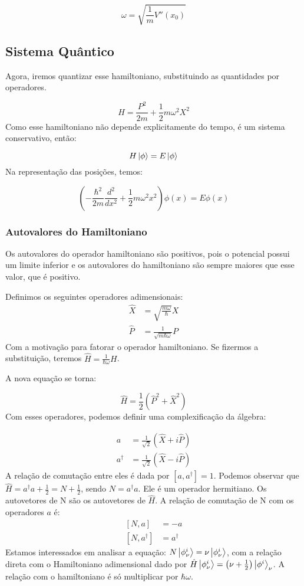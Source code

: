 \documentclass{article}
\begin{document}
	$$\omega =\sqrt{ \frac{1}{m}V''(x_{0}) }$$
	\subsection{Sistema Quântico}
	
	Agora, iremos quantizar esse hamiltoniano, substituindo as quantidades por operadores.
	
	$$
	H=\frac {P^{2}}{2m}
	+\frac{1}{2}m\omega^{2}X^{2}
	$$
	Como esse hamiltoniano não depende explicitamente do tempo, é um sistema conservativo, então:
	
	$$H\ket{\phi}=E\ket{\phi}  $$
	Na representação das posições, temos:
	
	$$(-\frac{\hbar^{2}}{2m} \frac{d^{2}}{dx^{2}}+\frac{1}{2}m\omega^{2}x^{2})\phi(x)=E\phi(x)$$
	\subsubsection{Autovalores do Hamiltoniano}
	Os autovalores do operador hamiltoniano são positivos, pois o potencial possui um limite inferior e os autovalores do hamiltoniano são sempre maiores que esse valor, que é positivo.
	
	Definimos os seguintes operadores adimensionais:
	$$
	\begin{aligned}
		\hat{X}&=\sqrt{ \frac{m\omega}{\hbar} }X \\
		\hat{P}&=\frac{1}{\sqrt{ m\hbar \omega  }}P
	\end{aligned}
	$$
	Com a motivação para fatorar o operador hamiltoniano. Se fizermos a substituição, teremos $\hat{H}=\frac{1}{\hbar \omega}H$.
	
	A nova equação se torna:
	
	$$\hat{H}=\frac{1}{2}(\hat{P}^{2}+\hat{X}^{2})$$
	Com esses operadores, podemos definir uma complexificação da álgebra:
	
	$$
	\begin{aligned}
		a&=\frac{1}{\sqrt{ 2 }}(\hat{X}+i\hat{P}) \\
		a^{\dagger}&=\frac{1}{\sqrt{ 2 }}(\hat{X}-i\hat{P})
	\end{aligned}
	$$
	A relação de comutação entre eles é dada por $\left[ a ,a^{\dagger}\right]=1$. Podemos observar que $\hat{H}=a^{\dagger}a+\frac{1}{2}=N+\frac{1}{2}$, sendo $N=a^{\dagger}a$. Ele é um operador hermitiano.
	Os autovetores de N são os autovetores de $\hat{H}$. A relação de comutação de N com os operadores $a$ é:
	$$
	\begin{aligned}
		\left[ N,a \right]&=-a \\
		\left[ N ,a^{\dagger}\right]&=a^{\dagger}  
	\end{aligned}
	$$
	Estamos interessados em analisar a equação: $N\ket{\phi^{i}_{\nu}}=\nu \ket{\phi^{i}_{\nu}}$, com a relação direta com o Hamiltoniano adimensional dado por $\hat{H}\ket{\phi^{i}_{\nu}}=\left( \nu+\frac{1}{2} \right)\ket{\phi^{i}}_{\nu}$.
	A relação com o hamiltoniano é só multiplicar por $\hbar \omega$.
	
\end{document}
